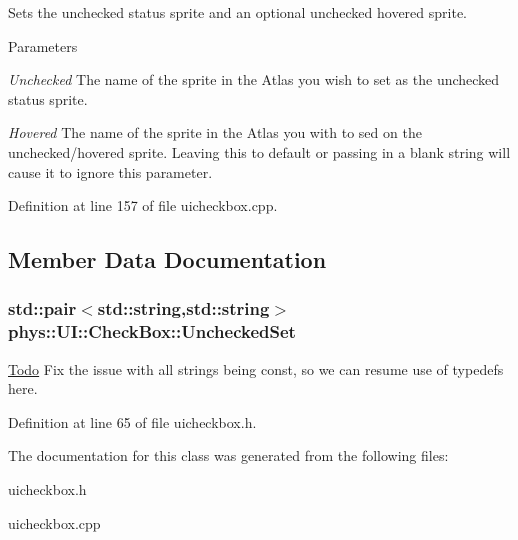 Sets the unchecked status sprite and an optional unchecked hovered sprite. 


\begin{DoxyParams}{Parameters}
\item[{\em Unchecked}]The name of the sprite in the Atlas you wish to set as the unchecked status sprite. \item[{\em Hovered}]The name of the sprite in the Atlas you with to sed on the unchecked/hovered sprite. Leaving this to default or passing in a blank string will cause it to ignore this parameter. \end{DoxyParams}


Definition at line 157 of file uicheckbox.cpp.



\subsection{Member Data Documentation}
\hypertarget{classphys_1_1UI_1_1CheckBox_a7b670d93f119193283ec78b94f842429}{
\subsubsection[{UncheckedSet}]{\setlength{\rightskip}{0pt plus 5cm}std::pair$<$std::string,std::string$>$ {\bf phys::UI::CheckBox::UncheckedSet}}}
\label{dd/d10/classphys_1_1UI_1_1CheckBox_a7b670d93f119193283ec78b94f842429}
\begin{Desc}
\item[\hyperlink{todo__todo000022}{Todo}]Fix the issue with all strings being const, so we can resume use of typedefs here. \end{Desc}


Definition at line 65 of file uicheckbox.h.



The documentation for this class was generated from the following files:\begin{DoxyCompactItemize}
\item 
uicheckbox.h\item 
uicheckbox.cpp\end{DoxyCompactItemize}
